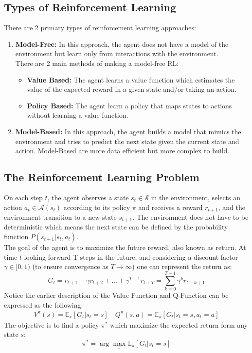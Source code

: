 \documentclass[12pt,a4paper]{report}
\begin{document}
\subsection{Types of Reinforcement Learning}
There are 2 primary types of reinforcement learning approaches:
\begin{enumerate}
    \item[] \textbf{Model-Free:} In this approach, the agent does not have a model of the environment but learn only from interactions with the environment.\\
    There are 2 main methods of making a model-free RL:
    \begin{itemize}
        \item \textbf{Value Based:} The agent learns a value function which estimates the value of the expected reward in a given state and/or taking an action.
        \item \textbf{Policy Based:} The agent learn a policy that maps states to actions without learning a value function. 
    \end{itemize}
    \item[] \textbf{Model-Based:} In this approach, the agent builds a model that mimics the environment and tries to predict the next state given the current state and action. Model-Based are more data efficient but more complex to build.
\end{enumerate}
\subsection{The Reinforcement Learning Problem}
On each step $t$, the agent observes a state $s_t\in\mathcal{S}$ in the environment, selects an action $a_t\in\mathcal{A}(s_t)$ according to its policy $\pi$ and receives a reward $r_{t+1}$, and the environment transition to a new state $s_{t+1}$. The environment does not have to be deterministic which means the next state can be defined by the probability function $P(s_{t+1}|s_t,a_t)$.\\
The goal of the agent is to maximize the future reward, also known as return. At time $t$ looking forward T steps in the future, and considering a discount factor $\gamma{\in}[0,1)$ (to ensure convergence as $T{\rightarrow}\infty$) one can represent the return as: $$G_t = r_{t+1} + {\gamma}r_{t+2}+\dots+{\gamma}^{T-1}r_{t+T}=\sum_{k=0}^{T-1}\gamma^{k}r_{t+k+1}$$
Notice the earlier description of the Value Function and Q-Function can be expressed as the following: $$\begin{aligned}V^{\pi}(s)=\mathbb{E}_\pi[G_t|s_t=s] \quad Q^{\pi}(s,a)=\mathbb{E}_\pi[G_t|s_t=s, a_t=a]\end{aligned}$$
The objective is to find a policy $\pi^*$ which maximize the expected return form any state $s$: $${\pi}^*=\arg\max_{\pi}\mathbb{E}_\pi[G_t|s_t=s]$$
\end{document}
